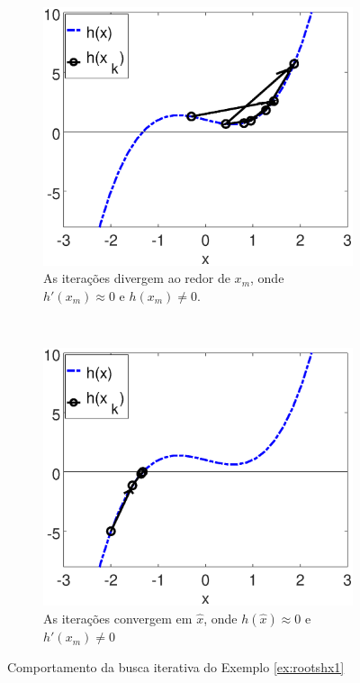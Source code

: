 \begin{figure}[!h]
    \centering
    \begin{subfigure}[b]{0.49\textwidth}
        \includegraphics[width=\textwidth]{chapters/roots/mfiles/hx/minimizando_hx_1.eps}
        \caption{As iterações divergem ao redor de $x_m$, onde $h'(x_m)\approx 0$ e $h(x_m)\neq 0$.}
        \label{fig:rootsNcasesa}
    \end{subfigure}
    ~ %
    \begin{subfigure}[b]{0.49\textwidth}
        \includegraphics[width=\textwidth]{chapters/roots/mfiles/hx/minimizando_hx_2.eps}
        \caption{As iterações convergem em $\hat{x}$, onde $h(\hat{x})\approx 0$ e $h'(x_m)\neq 0$}
        \label{fig:rootsNcasesb}
    \end{subfigure}
    \caption{Comportamento da busca iterativa do Exemplo \ref{ex:rootshx1}}
    \label{fig:rootsNcases}
\end{figure}

